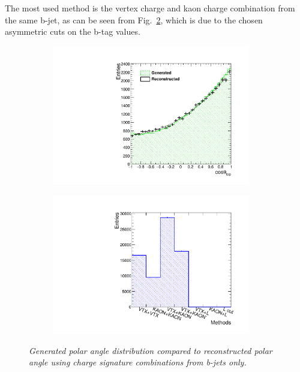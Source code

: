 The most used method is the vertex charge and kaon charge combination from the same b-jet, as can be seen from Fig.~\ref{fig:TopAsymmetryNoCutBjet_b_3}, which is due to the chosen asymmetric cuts on the b-tag values. 
\begin{figure}[h]
	\centering
	\begin{subfigure}{0.5\textwidth}
		\includegraphics[width=0.95\textwidth]{ILD/plots/top-asymmetry-bonly-gcut.pdf}
		\caption{\label{fig:TopAsymmetryNoCutBjet_a_3} }
	\end{subfigure}%
	\begin{subfigure}{0.5\textwidth}
		\centering
		\includegraphics[width=0.95\textwidth]{ILD/plots/top-methods-bonly-gcut.pdf}
		\caption{\label{fig:TopAsymmetryNoCutBjet_b_3} }
	\end{subfigure}
	\caption{\sl Generated polar angle distribution compared to reconstructed polar angle using charge signature combinations from b-jets only. }
	\label{fig:TopAsymmetryNoCutBjet_3}
\end{figure}

